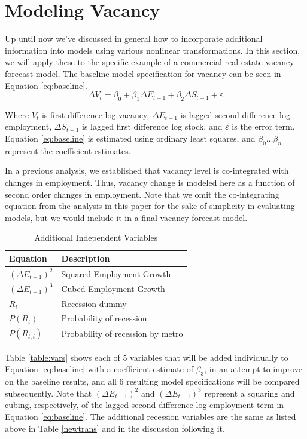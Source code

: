 \documentclass[10pt]{article}
\begin{document}
\section*{Modeling Vacancy}
Up until now we've discussed in general how to incorporate additional information into models using various nonlinear transformations.  In this section, we will apply these to the specific example of a commercial real estate vacancy forecast model. The baseline model specification for vacancy can be seen in Equation \ref{eq:baseline}.
\begin{equation} \label{eq:baseline}
\Delta V_t = \beta_0 + \beta_1 \Delta E_{t-1} + \beta_2 \Delta S_{t-1} + \varepsilon
\end{equation}

Where $V_t$ is first difference log vacancy, $\Delta E_{t-1}$ is lagged second difference log employment, $\Delta S_{t-1}$ is lagged first difference log stock, and $\varepsilon$ is the error term.  Equation \ref{eq:baseline} is estimated using ordinary least squares, and $\beta_0 \dots \beta_n$ represent the coefficient estimates.

In a previous analysis, we established that vacancy level is co-integrated with changes in employment.  Thus, vacancy change is modeled here as a function of second order changes in employment.  Note that we omit the co-integrating equation from the analysis in this paper for the sake of simplicity in evaluating models, but we would include it in a final vacancy forecast model.

\begin{table}[h]
\caption{Additional Independent Variables} \label{table:vars}
\begin{center}
\begin{tabular}{l l}
Equation & Description \\ \midrule
$(\Delta E_{t-1})^2$ & Squared Employment Growth \\
$(\Delta E_{t-1})^3$ & Cubed Employment Growth \\
$R_t$ & Recession dummy \\
$P(R_t)$ & Probability of recession \\
$P(R_{t,i})$ & Probability of recession by metro \\
\midrule
\end{tabular}
\end{center}
\label{default}
\end{table}%

Table \ref{table:vars} shows each of 5 variables that will be added individually to Equation \ref{eq:baseline} with a coefficient estimate of $\beta_3$, in an attempt to improve on the baseline results, and all 6 resulting model specifications will be compared subsequently.  Note that $(\Delta E_{t-1})^2$ and $(\Delta E_{t-1})^3$ represent a squaring and cubing, respectively, of the lagged second difference log employment term in Equation \ref{eq:baseline}.  The additional recession variables are the same as listed above in Table \ref{newtrans} and in the discussion following it.
\end{document}
